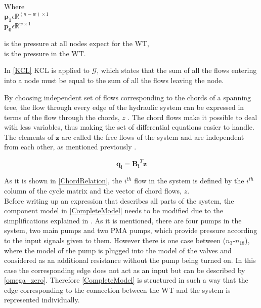 \begin{minipage}[t]{0.20\textwidth}
Where\\
\hspace*{8mm} $\pmb{p_1} \epsilon \mathbb{R}^{(n-w) \times 1}$  \\
\hspace*{8mm} $\pmb{p_0} \epsilon \mathbb{R}^{w \times 1} $ 
\end{minipage}
\begin{minipage}[t]{0.68\textwidth}
\vspace*{2mm}
\hspace*{4mm} is the pressure at all nodes expect for the WT,\\
\hspace*{4mm} is the pressure in the WT.
\end{minipage}

In \eqref{KCL} KCL is applied to $\mathcal{G}$, which states that the sum of all the flows entering into a node must be equal to the sum of all the flows leaving the node.

By choosing independent set of flows corresponding to the chords of a spanning tree, the flow through every edge of the hydraulic system can be expressed in terms of the flow through the chords, $z$ \cite{GraphModel}.
The chord flows make it possible to deal with less variables, thus making the set of differential equations easier to handle.  The elements of $\pmb{z}$ are called the free flows of the system and are independent from each other, as mentioned previously \cite{GraphTheoryCarsten}.

\begin{equation}
  \pmb{q_i} = \pmb{B_i} ^{T}  \pmb{z}
  \label{ChordRelation}
\end{equation}

As it is shown in \eqref{ChordRelation}, the $i^{th}$ flow in the system is defined by the $i^{th}$ column of the cycle matrix and the vector of chord flows, $z$. 
\\
Before writing up an expression that describes all parts of the system, the component model in \eqref{CompleteModel} needs to be modified due to the simplifications explained in . As it is mentioned, there are four pumps in the system, two main pumps and two PMA pumps, which provide pressure according to the input signals given to them. However there is one case between ($n_3$-$n_{18}$), where the model of the pump is plugged into the model of the valves and considered as an additional resistance without the pump being turned on. In this case the corresponding edge does not act as an input but can be described by \eqref{omega_zero}. Therefore \eqref{CompleteModel} is structured in such a way that the edge corresponding to the connection between the WT and the system is represented individually. 

